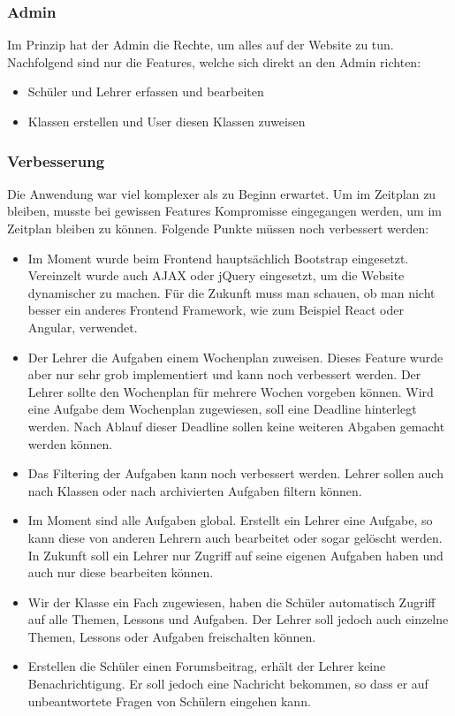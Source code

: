 \subsubsection*{Admin}
Im Prinzip hat der Admin die Rechte, um alles auf der Website zu tun. Nachfolgend sind nur die Features, welche sich direkt an den Admin richten:

\begin{itemize}
	\item Schüler und Lehrer erfassen und bearbeiten
	\item Klassen erstellen und User diesen Klassen zuweisen
\end{itemize}


\subsubsection{Verbesserung}
\label{verbesserung}
Die Anwendung war viel komplexer als zu Beginn erwartet. Um im Zeitplan zu bleiben, musste bei gewissen Features  Kompromisse eingegangen werden, um im Zeitplan bleiben zu können. Folgende Punkte müssen noch verbessert werden:

\begin{itemize}
	\item Im Moment wurde beim Frontend hauptsächlich Bootstrap eingesetzt. Vereinzelt wurde auch AJAX oder jQuery eingesetzt, um die Website dynamischer zu machen. Für die Zukunft muss man schauen, ob man nicht besser ein anderes Frontend Framework, wie zum Beispiel React oder Angular, verwendet.
	\item Der Lehrer die Aufgaben einem Wochenplan zuweisen. Dieses Feature wurde aber nur sehr grob implementiert und kann noch verbessert werden. Der Lehrer sollte den Wochenplan für mehrere Wochen vorgeben können. Wird eine Aufgabe dem Wochenplan zugewiesen, soll eine Deadline hinterlegt werden. Nach Ablauf dieser Deadline sollen keine weiteren Abgaben gemacht werden können.
	\item Das Filtering der Aufgaben kann noch verbessert werden. Lehrer sollen auch nach Klassen oder nach archivierten Aufgaben filtern können.
	\item Im Moment sind alle Aufgaben global. Erstellt ein Lehrer eine Aufgabe, so kann diese von anderen Lehrern auch bearbeitet oder sogar gelöscht werden. In Zukunft soll ein Lehrer nur Zugriff auf seine eigenen Aufgaben haben und auch nur diese bearbeiten können.
	\item Wir der Klasse ein Fach zugewiesen, haben die Schüler automatisch Zugriff auf alle Themen, Lessons und Aufgaben. Der Lehrer soll jedoch auch einzelne Themen, Lessons oder Aufgaben freischalten können.
	\item Erstellen die Schüler einen Forumsbeitrag, erhält der Lehrer keine Benachrichtigung. Er soll jedoch eine Nachricht bekommen, so dass er auf unbeantwortete Fragen von Schülern eingehen kann.
\end{itemize}


